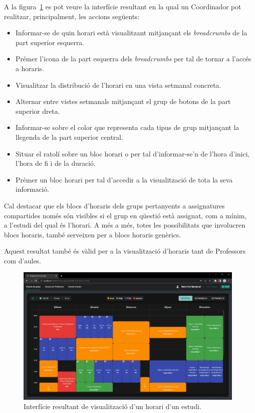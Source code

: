 \documentclass[a4paper,12pt]{ThesisStyle}
\begin{document}
A la figura~\ref{img:resultats_horaris_visualitzacio} es pot veure la interfície resultant en la qual un Coordinador pot realitzar, principalment, les accions següents:
\begin{itemize}
  \item Informar-se de quin horari està visualitzant mitjançant els \textit{breadcrumbs} de la part superior esquerra.
  \item Prémer l'icona de la part esquerra dels \textit{breadcrumbs} per tal de tornar a l'accés a horaris.
  \item Visualitzar la distribució de l'horari en una vista setmanal concreta.
  \item Alternar entre vistes setmanals mitjançant el grup de botons de la part superior dreta.
  \item Informar-se sobre el color que representa cada tipus de grup mitjançant la llegenda de la part superior central.
  \item Situar el ratolí sobre un bloc horari o per tal d'informar-se'n de l'hora d'inici, l'hora de fi i de la duració.
  \item Prémer un bloc horari per tal d'accedir a la visualització de tota la seva informació.
\end{itemize}

Cal destacar que els blocs d'horaris dels grups pertanyents a assignatures compartides només són visibles si el grup en qüestió està assignat, com a mínim, a l'estudi del qual és l'horari. A més a més, totes les possibilitats que involucren blocs horaris, també serveixen per a blocs horaris genèrics.

Aquest resultat també és vàlid per a la visualització d'horaris tant de Professors com d'aules.

\newpage

\begin{figure}[H]
  \centering
  \includegraphics[width=\textwidth]{assets/results/horaris/visualitzacio.png}
  \caption{\label{img:resultats_horaris_visualitzacio}Interfície resultant de visualització d'un horari d'un estudi.}
\end{figure}
\end{document}
